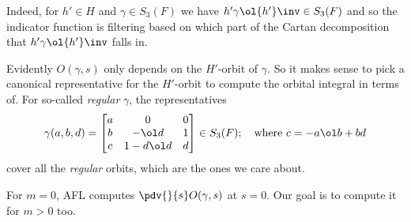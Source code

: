 Indeed, for $h' \in H$ and $\gamma \in S_3(F)$ we have $h' \gamma \ol{h'}\inv \in S_3(F)$
and so the indicator function is filtering based on which part of the
Cartan decomposition that $h' \gamma \ol{h'}\inv$ falls in.

Evidently $O(\gamma, s)$ only depends on the $H'$-orbit of $\gamma$.
So it makes sense to pick a canonical representative for the $H'$-orbit to compute
the orbital integral in terms of.
For so-called \emph{regular} $\gamma$, the representatives
\[ \gamma(a,b,d) =
  \begin{bmatrix}
    a & 0 & 0 \\
    b & - \ol d & 1 \\
    c & 1 - d \ol d & d
  \end{bmatrix}
  \in S_3(F); \quad \text{where $c = -a \ol b + b d$} \]
cover all the \emph{regular} orbits, which are the ones we care about.

For $m=0$, AFL computes $\pdv{}{s}O(\gamma,s)$ at $s=0$.
Our goal is to compute it for $m > 0$ too.
